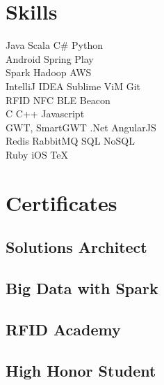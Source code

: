 \documentclass[]{furkanvarol-resume}
\begin{document}
\begin{minipage}[t]{0.33\textwidth}

\section{Skills}
Java \textbullet{} Scala \textbullet{} C\# \textbullet{} Python \\
Android \textbullet{} Spring \textbullet{} Play \\
Spark \textbullet{} Hadoop \textbullet{} AWS \\
IntelliJ IDEA \textbullet{} Sublime \textbullet{} ViM \textbullet{} Git \\
RFID \textbullet{} NFC \textbullet{} BLE \textbullet{} Beacon \\
C \textbullet{} C++ \textbullet{} Javascript \\
GWT, SmartGWT \textbullet{} .Net \textbullet{} AngularJS \\
Redis \textbullet{} RabbitMQ \textbullet{} SQL \textbullet{} NoSQL \\
Ruby \textbullet{} iOS \textbullet{} TeX
\sectionsep


\section{Certificates}

\subsection{Solutions Architect}
\sectionsep

\subsection{Big Data with Spark}
\sectionsep

\subsection{RFID Academy}
\sectionsep

\subsection{High Honor Student}
\sectionsep


\end{minipage}
\end{document}

